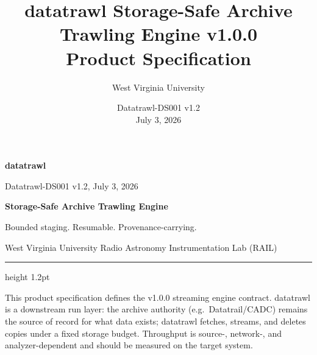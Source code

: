 \documentclass[10pt,letterpaper]{article}
\title{datatrawl Storage-Safe Archive Trawling Engine v1.0.0\\Product Specification}
\author{West Virginia University}
\date{Datatrawl-DS001 v1.2 \\ July 3, 2026}
\begin{document}
\thispagestyle{fancy}
{\sffamily
\begin{minipage}[t]{0.39\textwidth}
  {\fontsize{24}{26}\selectfont\bfseries\color{TrawlAmber}datatrawl}\par
  {\small Datatrawl-DS001 v1.2, July 3, 2026}
\end{minipage}%
\begin{minipage}[t]{0.61\textwidth}
  \raggedleft
  {\large\bfseries Storage-Safe Archive Trawling Engine}\par
  {\small Bounded staging. Resumable. Provenance-carrying.}\par
  {\small West Virginia University Radio Astronomy Instrumentation Lab (RAIL)}
\end{minipage}
}
\vspace{6pt}
{\color{TrawlAmber}\hrule height 1.2pt}
\vspace{8pt}

{\small\color{TrawlGray}This product specification defines the v1.0.0 streaming
engine contract. datatrawl is a downstream run layer: the archive authority
(e.g.\ Datatrail/CADC) remains the source of record for what data exists;
datatrawl fetches, streams, and deletes copies under a fixed storage budget.
Throughput is source-, network-, and analyzer-dependent and should be measured
on the target system.}
\end{document}
